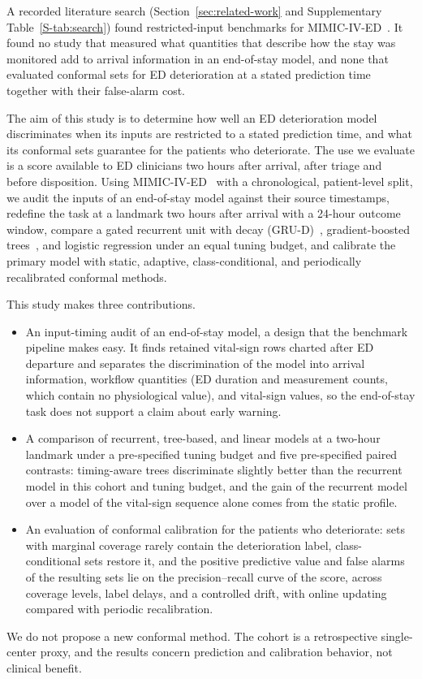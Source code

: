 A recorded literature search (Section~\ref{sec:related-work} and Supplementary Table~\ref{S-tab:search}) found restricted-input benchmarks for
MIMIC-IV-ED~\cite{solaiman2026earlydeterioration}. It found no study that measured what quantities that describe how the stay was monitored add to arrival information in an end-of-stay model, and none that evaluated conformal sets for ED deterioration at a stated prediction time together with their false-alarm cost.

The aim of this study is to determine how well an ED deterioration model discriminates when its inputs are restricted to a stated prediction time, and what its
conformal sets guarantee for the patients who deteriorate. The use we evaluate is a score available to ED clinicians two hours after arrival, after triage and before
disposition. Using MIMIC-IV-ED~\cite{johnson2023mimicived} with a chronological, patient-level split, we audit the inputs of an end-of-stay model against their source timestamps, redefine the task at a landmark two hours after arrival with a 24-hour outcome window, compare a gated recurrent unit with decay (GRU-D)~\cite{che2018grud}, gradient-boosted trees~\cite{chen2016xgboost}, and logistic regression under an equal tuning budget, and calibrate the primary model with static, adaptive, class-conditional, and periodically recalibrated conformal methods.

This study makes three contributions.
\begin{itemize}
\item An input-timing audit of an end-of-stay model, a design that the benchmark pipeline makes easy. It finds retained vital-sign rows charted after ED departure and separates the discrimination of the model into arrival information, workflow quantities (ED duration and measurement counts, which contain no physiological value), and vital-sign values, so the end-of-stay task does not support a claim about early warning.
\item A comparison of recurrent, tree-based, and linear models at a two-hour landmark under a pre-specified tuning budget and five pre-specified paired contrasts: timing-aware trees discriminate slightly better than the recurrent model in this cohort and tuning budget, and the gain of the recurrent model over a model of the vital-sign sequence alone comes from the static profile.
\item An evaluation of conformal calibration for the patients who deteriorate: sets with marginal coverage rarely contain the deterioration label, class-conditional sets restore it, and the positive predictive value and false alarms of the resulting sets lie on the precision--recall curve of the score, across coverage levels, label delays, and a controlled drift, with online updating compared with periodic recalibration.
\end{itemize}
We do not propose a new conformal method. The cohort is a retrospective single-center proxy, and the results concern prediction and calibration behavior, not clinical
benefit.

